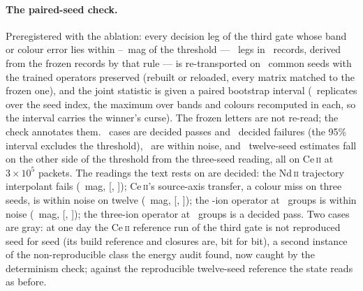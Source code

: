 \documentclass[aps,prl,twocolumn,superscriptaddress,nofootinbib,longbibliography]{revtex4-2}
\begin{document}
\paragraph{The paired-seed check.} Preregistered with the ablation: every
decision leg of the third gate whose band or colour error lies within
\PBUWinLo--\PBUWinHi~mag of the threshold --- \PBUCases\ legs in
\PBURecords\ records, derived from the frozen records by that rule --- is
re-transported on \PBUSeeds\ common seeds with the trained operators
preserved (rebuilt or reloaded, every matrix matched to the frozen one),
and the joint statistic is given a paired bootstrap interval
(\PBUBoot\ replicates over the seed index, the maximum over bands and
colours recomputed in each, so the interval carries the winner's curse).
The frozen letters are not re-read; the check annotates them.
\PBUPass\ cases are decided passes and \PBUFail\ decided failures (the
95\% interval excludes the threshold), \PBUNoise\ are within noise, and
\PBUFlips\ twelve-seed estimates fall on the other side of the threshold
from the three-seed reading, all on Ce\,\textsc{ii} at $3\times10^5$
packets. The readings the text rests on are decided: the Nd\,\textsc{ii}
trajectory interpolant fails (\PBUNdTrajWhole~mag,
[\PBUNdTrajWholeLo, \PBUNdTrajWholeHi]); Ce\,\textsc{ii}'s
source-axis transfer, a colour miss on three seeds, is within noise on
twelve (\PBUCeJFix~mag, [\PBUCeJFixLo, \PBUCeJFixHi]); the
\PBBlendNIons-ion operator at \PBBlendKrec\ groups is within noise
(\PBUBlend~mag, [\PBUBlendLo, \PBUBlendHi]); the three-ion operator at
\PBKdirect\ groups is a decided pass. Two cases are gray: at one day the
Ce\,\textsc{ii} reference run of the third gate is not reproduced seed
for seed (its build reference and closures are, bit for bit), a second
instance of the non-reproducible class the energy audit found, now caught
by the determinism check; against the reproducible twelve-seed reference
the state reads as before.
\end{document}
